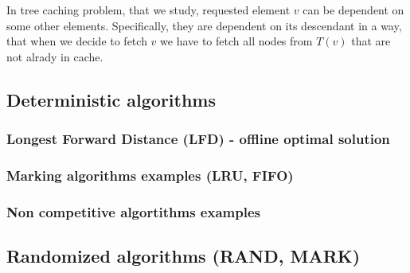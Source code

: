In tree caching problem, that we study, requested element $v$ can be dependent 
on some other elements. Specifically, they are dependent on its descendant in a 
way, that when we decide to fetch $v$ we have to fetch all nodes from $T(v)$ 
that are not alrady in cache.

\subsection{Deterministic algorithms}

\subsubsection{Longest Forward Distance (LFD) - offline optimal solution}
\subsubsection{Marking algorithms examples (LRU, FIFO)}
\subsubsection{Non competitive algortithms examples}

\subsection{Randomized algorithms (RAND, MARK)}